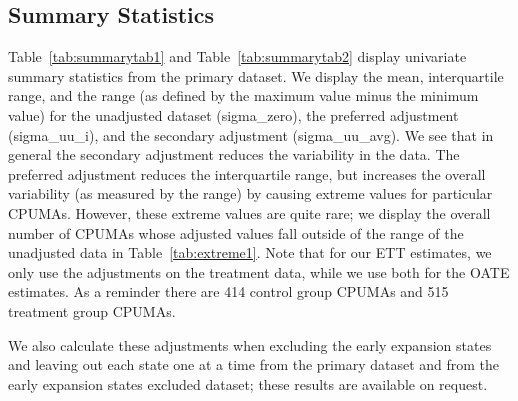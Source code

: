 \documentclass[aoas]{imsart}
\theoremstyle{plain}
\theoremstyle{remark}
\begin{document}
\begin{appendix}





\section{Summary Statistics}
\label{sec:appendixsumstat}

Table~\ref{tab:summarytab1} and Table~\ref{tab:summarytab2} display univariate summary statistics from the primary dataset. We display the mean, interquartile range, and the range (as defined by the maximum value minus the minimum value) for the unadjusted dataset (sigma\_zero), the preferred adjustment (sigma\_uu\_i), and the secondary adjustment (sigma\_uu\_avg). We see that in general the secondary adjustment reduces the variability in the data. The preferred adjustment reduces the interquartile range, but increases the overall variability (as measured by the range) by causing extreme values for particular CPUMAs. However, these extreme values are quite rare; we display the overall number of CPUMAs whose adjusted values fall outside of the range of the unadjusted data in Table~\ref{tab:extreme1}. Note that for our ETT estimates, we only use the adjustments on the treatment data, while we use both for the OATE estimates. As a reminder there are 414 control group CPUMAs and 515 treatment group CPUMAs.

We also calculate these adjustments when excluding the early expansion states and leaving out each state one at a time from the primary dataset and from the early expansion states excluded dataset; these results are available on request. 


\end{appendix}
\end{document}
